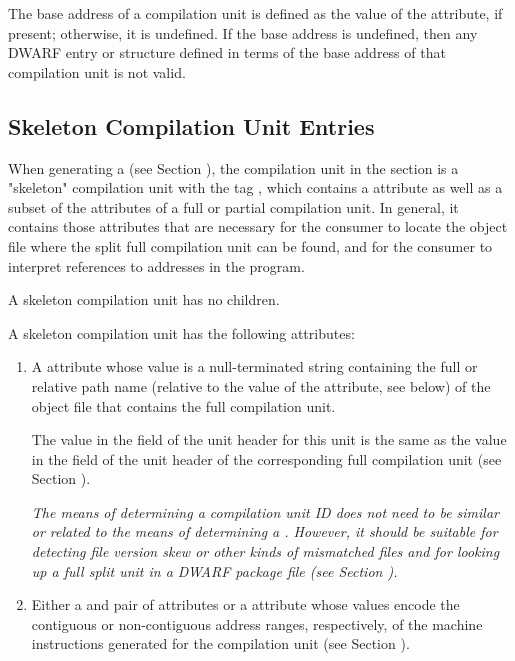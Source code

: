 The  base address of a compilation unit is defined as the
value of the \DWATlowpc{} attribute, if present; otherwise,
it is undefined. If the base address is undefined, then any
DWARF entry or structure defined in terms of the base address
of that compilation unit is not valid.

\subsection{Skeleton Compilation Unit Entries}
\label{chap:skeletoncompilationunitentries}
When generating a \splitDWARFobjectfile{} (see
Section ), the
compilation unit in the \dotdebuginfo{} section is a "skeleton"
compilation unit with the tag
\DWTAGskeletonunitTARG, which contains a
\DWATdwoname{} attribute as well as a subset of the
attributes of a full or partial compilation unit. In general,
it contains those attributes that are necessary for the consumer
to locate the object file where the split full compilation unit
can be found, and for the consumer to interpret references to
addresses in the program.

A skeleton compilation unit has no children.

A skeleton compilation unit has
\bb
the following attributes:
\eb

\begin{enumerate}[1. ]

\item {}
A \DWATdwonameDEFN{} attribute
whose value is a
null-terminated string containing the full or relative
path name (relative to the value of the \DWATcompdir{} attribute,
see below) of the object file that contains the full
compilation unit.

The value in the \HFNdwoid{} field of the unit header for
this unit is the same as the value in the \HFNdwoid{} field
of the unit header of the corresponding full compilation
unit (see Section ).

\textit{The means of determining a compilation unit ID does
not need to be similar or related to the means of
determining a \TUsignature. However, it should
be suitable for detecting file version skew or other
kinds of mismatched files and for looking up a full
split unit in a DWARF package file
(see Section ).}

\bb
\item
Either a \DWATlowpc{} and \DWAThighpc{} pair of
attributes or a
\DWATranges{} attribute
whose values encode the contiguous or
non-contiguous address ranges, respectively,
of the machine instructions generated for the compilation
unit (see Section ).
\eb

\end{enumerate}

